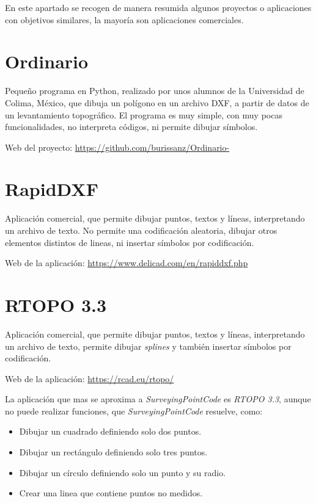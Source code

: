 
En este apartado se recogen de manera resumida algunos proyectos o aplicaciones con objetivos similares, la mayoría son aplicaciones comerciales.

\section{Ordinario}

Pequeño programa en Python, realizado por unos alumnos de la Universidad de Colima, México, que dibuja un polígono en un archivo DXF, a partir de datos de un levantamiento topográfico. El programa es muy simple, con muy pocas funcionalidades, no interpreta códigos, ni permite dibujar símbolos. 

Web del proyecto: \url{https://github.com/burissanz/Ordinario-}


\section{RapidDXF}

Aplicación comercial, que permite dibujar puntos, textos y líneas, interpretando un archivo de texto. No permite una codificación aleatoria, dibujar otros elementos distintos de lineas, ni insertar símbolos por codificación.

Web de la aplicación: \url{https://www.delicad.com/en/rapiddxf.php}


\section{RTOPO 3.3}
Aplicación comercial, que permite dibujar puntos, textos y líneas, interpretando un archivo de texto, permite dibujar \emph{splines} y también insertar símbolos por codificación.

Web de la aplicación: \url{https://rcad.eu/rtopo/}

La aplicación que mas se aproxima a \emph{SurveyingPointCode} es \emph{RTOPO 3.3}, aunque no puede realizar funciones, que \emph{SurveyingPointCode} resuelve, como:
\begin{itemize}
\item Dibujar un cuadrado definiendo solo dos puntos.
\item Dibujar un rectángulo definiendo solo tres puntos.
\item Dibujar un círculo definiendo solo un punto y su radio.
\item Crear una linea que contiene puntos no medidos.
\end{itemize}


